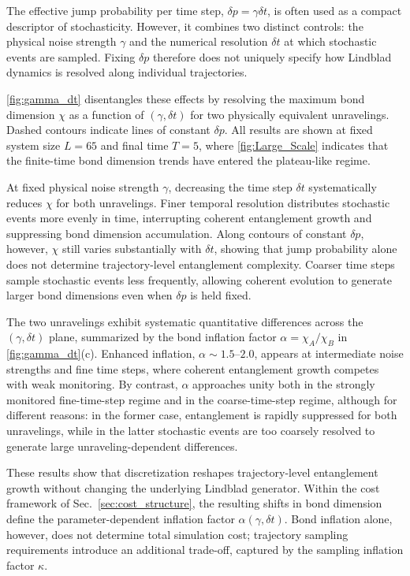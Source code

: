 \documentclass[aps, pra, superscriptaddress, reprint, floatfix]{revtex4-2}
\theoremstyle{plain}
\begin{document}
The effective jump probability per time step, $\delta p=\gamma\delta t$, is often used as a compact descriptor of stochasticity. However, it combines two distinct controls: the physical noise strength $\gamma$ and the numerical resolution $\delta t$ at which stochastic events are sampled. Fixing $\delta p$ therefore does not uniquely specify how Lindblad dynamics is resolved along individual trajectories.

\cref{fig:gamma_dt} disentangles these effects by resolving the maximum bond dimension $\chi$ as a function of $(\gamma,\delta t)$ for two physically equivalent unravelings. Dashed contours indicate lines of constant $\delta p$. All results are shown at fixed system size $L=65$ and final time $T=5$, where \cref{fig:Large_Scale} indicates that the finite-time bond dimension trends have entered the plateau-like regime.

At fixed physical noise strength $\gamma$, decreasing the time step $\delta t$ systematically reduces $\chi$ for both unravelings. Finer temporal resolution distributes stochastic events more evenly in time, interrupting coherent entanglement growth and suppressing bond dimension accumulation. Along contours of constant $\delta p$, however, $\chi$ still varies substantially with $\delta t$, showing that jump probability alone does not determine trajectory-level entanglement complexity. Coarser time steps sample stochastic events less frequently, allowing coherent evolution to generate larger bond dimensions even when $\delta p$ is held fixed.

The two unravelings exhibit systematic quantitative differences across the $(\gamma,\delta t)$ plane, summarized by the bond inflation factor $\alpha=\chi_A/\chi_B$ in \cref{fig:gamma_dt}(c). Enhanced inflation, $\alpha\sim1.5$--$2.0$, appears at intermediate noise strengths and fine time steps, where coherent entanglement growth competes with weak monitoring. By contrast, $\alpha$ approaches unity both in the strongly monitored fine-time-step regime and in the coarse-time-step regime, although for different reasons: in the former case, entanglement is rapidly suppressed for both unravelings, while in the latter stochastic events are too coarsely resolved to generate large unraveling-dependent differences.

These results show that discretization reshapes trajectory-level entanglement growth without changing the underlying Lindblad generator. Within the cost framework of Sec.~\ref{sec:cost_structure}, the resulting shifts in bond dimension define the parameter-dependent inflation factor $\alpha(\gamma,\delta t)$. Bond inflation alone, however, does not determine total simulation cost; trajectory sampling requirements introduce an additional trade-off, captured by the sampling inflation factor $\kappa$.
\end{document}
